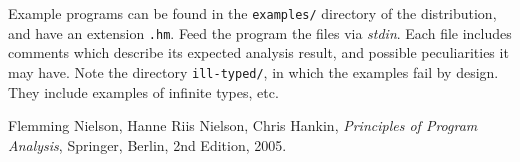 \documentclass[a4paper]{article}
\begin{document}
Example programs can be found in the \texttt{examples/} directory of the distribution, 
and have an extension \texttt{.hm}. Feed the program the files via \emph{stdin}. Each file
includes comments which describe its expected analysis result, and possible peculiarities
it may have. Note the directory \texttt{ill-typed/}, in which the examples fail by design.
They include examples of infinite types, etc. 


\begin{thebibliography}{9}

  {Flemming Nielson, Hanne Riis Nielson, Chris Hankin},
  \emph{Principles of Program Analysis},
  Springer, Berlin,
  2nd Edition,
  2005.

\end{thebibliography}
\end{document}
